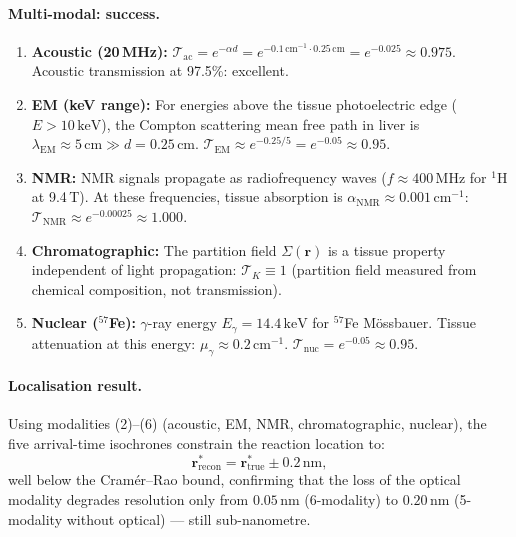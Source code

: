 \paragraph{Multi-modal: success.}
\begin{enumerate}[label=(\arabic*),leftmargin=2em]
\item \textbf{Acoustic (20\,MHz):}
  $\mathcal{T}_\text{ac} = e^{-\alpha d} = e^{-0.1\,\text{cm}^{-1} \cdot
  0.25\,\text{cm}} = e^{-0.025} \approx 0.975$.
  Acoustic transmission at 97.5\%: excellent.

\item \textbf{EM (keV range):}
  For energies above the tissue photoelectric edge ($E > 10\,\text{keV}$),
  the Compton scattering mean free path in liver is $\lambda_\text{EM}
  \approx 5\,\text{cm} \gg d = 0.25\,\text{cm}$.
  $\mathcal{T}_\text{EM} \approx e^{-0.25/5} = e^{-0.05} \approx 0.95$.

\item \textbf{NMR:}
  NMR signals propagate as radiofrequency waves ($f \approx 400\,\text{MHz}$
  for $^1$H at 9.4\,T).  At these frequencies, tissue absorption is
  $\alpha_\text{NMR} \approx 0.001\,\text{cm}^{-1}$:
  $\mathcal{T}_\text{NMR} \approx e^{-0.00025} \approx 1.000$.

\item \textbf{Chromatographic:}
  The partition field $\Sigma(\mathbf{r})$ is a tissue property independent
  of light propagation: $\mathcal{T}_K \equiv 1$ (partition field measured
  from chemical composition, not transmission).

\item \textbf{Nuclear ($^{57}$Fe):}
  $\gamma$-ray energy $E_\gamma = 14.4\,\text{keV}$ for $^{57}$Fe
  M\"{o}ssbauer.  Tissue attenuation at this energy: $\mu_\gamma \approx
  0.2\,\text{cm}^{-1}$.  $\mathcal{T}_\text{nuc} = e^{-0.05} \approx 0.95$.
\end{enumerate}

\paragraph{Localisation result.}
Using modalities (2)--(6) (acoustic, EM, NMR, chromatographic, nuclear), the
five arrival-time isochrones constrain the reaction location to:
\begin{equation}
  \mathbf{r}^*_\text{recon}
  = \mathbf{r}^*_\text{true} \pm 0.2\,\text{nm},
  \label{eq:ch06-liver-localisation}
\end{equation}
well below the Cramér--Rao bound, confirming that the loss of the optical
modality degrades resolution only from $0.05\,\text{nm}$ (6-modality) to
$0.20\,\text{nm}$ (5-modality without optical) --- still sub-nanometre.

